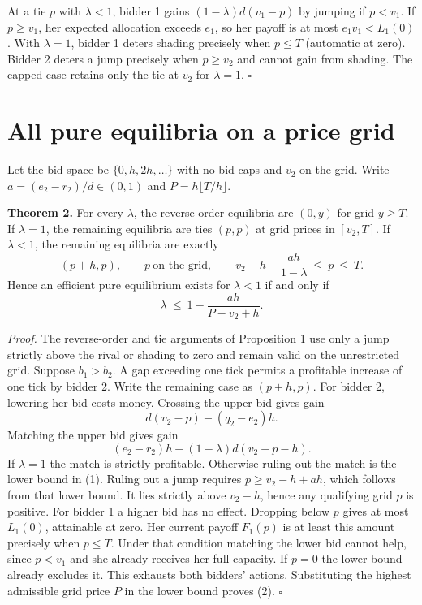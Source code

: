\documentclass[11pt]{article}
\begin{document}
At a tie $p$ with $\lambda<1$, bidder 1 gains $(1-\lambda)d(v_1-p)$ by jumping if $p<v_1$. If $p\ge v_1$, her expected allocation exceeds $e_1$, so her payoff is at most $e_1v_1<L_1(0)$. With $\lambda=1$, bidder 1 deters shading precisely when $p\le T$ (automatic at zero). Bidder 2 deters a jump precisely when $p\ge v_2$ and cannot gain from shading. The capped case retains only the tie at $v_2$ for $\lambda=1$. \hfill$\square$
\newpage
\section{All pure equilibria on a price grid}
Let the bid space be $\{0,h,2h,\ldots\}$ with no bid caps and $v_2$ on the grid. Write $a=(e_2-r_2)/d\in(0,1)$ and $P=h\lfloor T/h\rfloor$.

\textbf{Theorem 2.} For every $\lambda$, the reverse-order equilibria are $(0,y)$ for grid $y\ge T$. If $\lambda=1$, the remaining equilibria are ties $(p,p)$ at grid prices in $[v_2,T]$. If $\lambda<1$, the remaining equilibria are exactly
\[
 (p+h,p),\qquad p\ \text{on the grid},\qquad
 v_2-h+\frac{ah}{1-\lambda}\ \le\ p\ \le\ T. \tag{1}
\]
Hence an efficient pure equilibrium exists for $\lambda<1$ if and only if
\[
 \lambda\ \le\ 1-\frac{ah}{P-v_2+h}. \tag{2}
\]

\textit{Proof.} The reverse-order and tie arguments of Proposition 1 use only a jump strictly above the rival or shading to zero and remain valid on the unrestricted grid. Suppose $b_1>b_2$. A gap exceeding one tick permits a profitable increase of one tick by bidder 2. Write the remaining case as $(p+h,p)$. For bidder 2, lowering her bid costs money. Crossing the upper bid gives gain
\[
 d(v_2-p)-(q_2-e_2)h.
\]
Matching the upper bid gives gain
\[
 (e_2-r_2)h+(1-\lambda)d(v_2-p-h). \tag{3}
\]
If $\lambda=1$ the match is strictly profitable. Otherwise ruling out the match is the lower bound in (1). Ruling out a jump requires $p\ge v_2-h+ah$, which follows from that lower bound. It lies strictly above $v_2-h$, hence any qualifying grid $p$ is positive. For bidder 1 a higher bid has no effect. Dropping below $p$ gives at most $L_1(0)$, attainable at zero. Her current payoff $F_1(p)$ is at least this amount precisely when $p\le T$. Under that condition matching the lower bid cannot help, since $p<v_1$ and she already receives her full capacity. If $p=0$ the lower bound already excludes it. This exhausts both bidders' actions. Substituting the highest admissible grid price $P$ in the lower bound proves (2). \hfill$\square$
\end{document}
